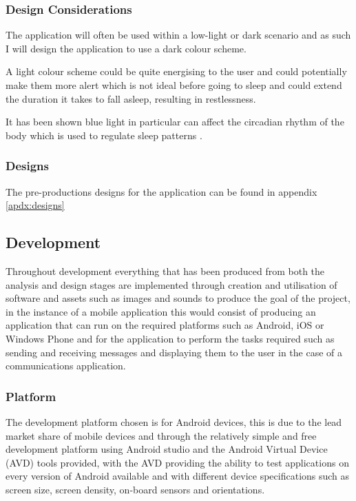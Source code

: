 \subsubsection{Design Considerations}\label{design-considerations}

The application will often be used within a low-light or dark scenario
and as such I will design the application to use a dark colour scheme.

A light colour scheme could be quite energising to the user and could
potentially make them more alert which is not ideal before going to
sleep and could extend the duration it takes to fall asleep, resulting
in restlessness.

It has been shown blue light in particular can affect the circadian
rhythm of the body which is used to regulate sleep patterns
\cite{oh2015analysis}.

\subsubsection{Designs}\label{designs}

The pre-productions designs for the application can be found in appendix
\ref{apdx:designs}

\subsection{Development}\label{development}

Throughout development everything that has been produced from both the
analysis and design stages are implemented through creation and
utilisation of software and assets such as images and sounds to produce
the goal of the project, in the instance of a mobile application this
would consist of producing an application that can run on the required
platforms such as Android, iOS or Windows Phone and for the application
to perform the tasks required such as sending and receiving messages and
displaying them to the user in the case of a communications application.

\subsubsection{Platform}\label{platform}

The development platform chosen is for Android devices, this is due to
the lead market share of mobile devices and through the relatively
simple and free development platform using Android studio and the
Android Virtual Device (AVD) tools provided, with the AVD providing the
ability to test applications on every version of Android available and
with different device specifications such as screen size, screen
density, on-board sensors and orientations.

